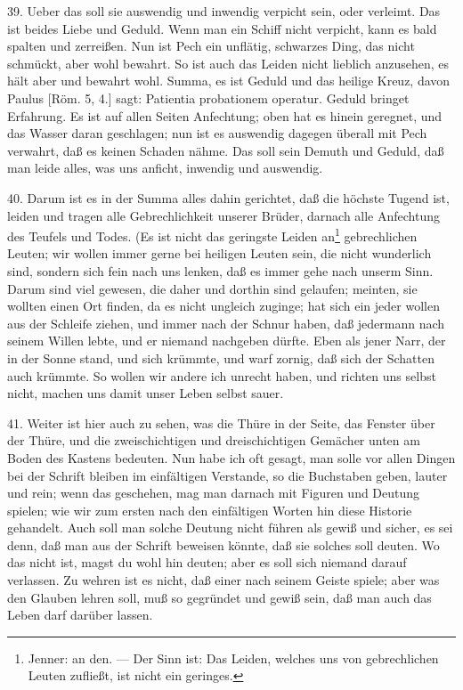 39. Ueber das soll sie auswendig und inwendig verpicht sein, oder verleimt. Das ist beides Liebe und Geduld. Wenn man ein Schiff nicht verpicht, kann es bald spalten und zerreißen. Nun ist Pech ein unflätig, schwarzes Ding, das nicht schmückt, aber wohl bewahrt. So ist auch das Leiden nicht lieblich anzusehen, es hält aber und bewahrt wohl. Summa, es ist Geduld und das heilige Kreuz, davon Paulus [Röm. 5, 4.] sagt: Patientia probationem operatur. Geduld bringet Erfahrung. Es ist auf allen Seiten Anfechtung; oben hat es hinein geregnet, und das Wasser daran geschlagen; nun ist es auswendig dagegen überall mit Pech verwahrt, daß es keinen Schaden nähme. Das soll sein Demuth und Geduld, daß man leide alles, was uns anficht, inwendig und auswendig.

40. Darum ist es in der Summa alles dahin gerichtet, daß die höchste Tugend ist, leiden und tragen alle Gebrechlichkeit unserer Brüder, darnach alle Anfechtung des Teufels und Todes. (Es ist nicht das geringste Leiden an\footnote{Jenner: an den. — Der Sinn ist: Das Leiden, welches uns von gebrechlichen Leuten zufließt, ist nicht ein geringes.} gebrechlichen Leuten; wir wollen immer gerne bei heiligen Leuten sein, die nicht wunderlich sind, sondern sich fein nach uns lenken, daß es immer gehe nach unserm Sinn. Darum sind viel gewesen, die daher und dorthin sind gelaufen; meinten, sie wollten einen Ort finden, da es nicht ungleich zuginge; hat sich ein jeder wollen aus der Schleife ziehen, und immer nach der Schnur haben, daß jedermann nach seinem Willen lebte, und er niemand nachgeben dürfte. Eben als jener Narr, der in der Sonne stand, und sich krümmte, und warf zornig, daß sich der Schatten auch krümmte. So wollen wir andere
ich unrecht haben, und richten uns selbst nicht, machen uns damit unser Leben selbst sauer.

41. Weiter ist hier auch zu sehen, was die Thüre in der Seite, das Fenster über der Thüre, und die zweischichtigen und dreischichtigen Gemächer unten am Boden des Kastens bedeuten. Nun habe ich oft gesagt, man solle vor allen Dingen bei der Schrift bleiben im einfältigen Verstande, so die Buchstaben geben, lauter und rein; wenn das geschehen, mag man darnach mit Figuren und Deutung spielen; wie wir zum ersten nach den einfältigen Worten hin diese Historie gehandelt. Auch soll man solche Deutung nicht führen als gewiß und sicher, es sei denn, daß man aus der Schrift beweisen könnte, daß sie solches soll deuten. Wo das nicht ist, magst du wohl hin deuten; aber es soll sich niemand darauf verlassen. Zu wehren ist es nicht, daß einer nach seinem Geiste spiele; aber was den Glauben lehren soll, muß so gegründet und gewiß sein, daß man auch das Leben darf darüber lassen.


